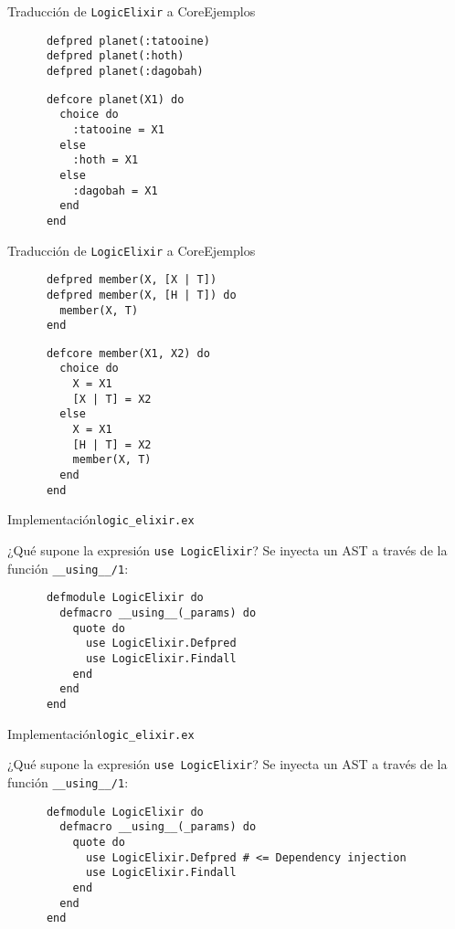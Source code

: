 \documentclass[14pt,aspectratio=169]{beamer}
\begin{document}
\begin{frame}[fragile]{Traducción de \texttt{LogicElixir} a Core}{Ejemplos}
  \begin{multicols}{2}
    \footnotesize \begin{verbatim}
      defpred planet(:tatooine)
      defpred planet(:hoth)
      defpred planet(:dagobah)
    \end{verbatim}
    \columnbreak
    \footnotesize \begin{verbatim}
      defcore planet(X1) do
        choice do
          :tatooine = X1
        else
          :hoth = X1
        else
          :dagobah = X1
        end
      end
    \end{verbatim}
  \end{multicols}
\end{frame}

\begin{frame}[fragile]{Traducción de \texttt{LogicElixir} a Core}{Ejemplos}
  \begin{multicols}{2}
    \footnotesize \begin{verbatim}
      defpred member(X, [X | T])
      defpred member(X, [H | T]) do
        member(X, T)
      end
    \end{verbatim}
    \columnbreak
    \footnotesize \begin{verbatim}
      defcore member(X1, X2) do
        choice do
          X = X1
          [X | T] = X2
        else
          X = X1
          [H | T] = X2
          member(X, T)
        end
      end
    \end{verbatim}
  \end{multicols}
\end{frame}

\begin{frame}[fragile]{Implementación}{\texttt{logic\_elixir.ex}}
  \begin{block}{¿Qué supone la expresión \texttt{use LogicElixir}?}
    Se inyecta un AST a través de la función \texttt{\_\_using\_\_/1}:
    \small\begin{verbatim}
      defmodule LogicElixir do
        defmacro __using__(_params) do
          quote do
            use LogicElixir.Defpred
            use LogicElixir.Findall
          end
        end
      end
    \end{verbatim}
  \end{block}
\end{frame}

\begin{frame}[fragile]{Implementación}{\texttt{logic\_elixir.ex}}
  \begin{block}{¿Qué supone la expresión \texttt{use LogicElixir}?}
    Se inyecta un AST a través de la función \texttt{\_\_using\_\_/1}:
    \small\begin{verbatim}
      defmodule LogicElixir do
        defmacro __using__(_params) do
          quote do
            use LogicElixir.Defpred # <= Dependency injection
            use LogicElixir.Findall
          end
        end
      end
    \end{verbatim}
  \end{block}
\end{frame}
\end{document}
